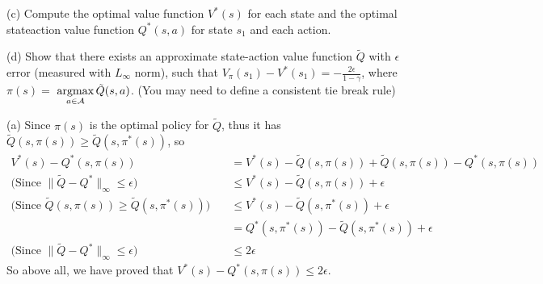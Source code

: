 \begin{homeworkProblem}
(c) Compute the optimal value function $V^*(s)$ for each state and the optimal stateaction value function $Q^*(s, a)$ for state $s_1$ and each action.

(d) Show that there exists an approximate state-action value function $\tilde{Q}$ with $\epsilon$ error (measured with $L_{\infty}$ norm), such that $V_\pi\left(s_1\right)-V^*\left(s_1\right)=-\frac{2 \epsilon}{1-\gamma}$, where $\pi(s)=$ $\mathop{\rm argmax}\limits_{a \in \mathcal{A}} \tilde{Q}(s, a)$. (You may need to define a consistent tie break rule)

\solution

(a) Since $\pi(s)$ is the optimal policy for $\tilde{Q}$, thus it has $\tilde{Q}(s, \pi(s)) \geq \tilde{Q}(s, \pi^*(s))$, so
\begin{align*}
V^*(s)-Q^*(s,\pi(s)) &= V^*(s)-\tilde{Q}(s,\pi(s))+\tilde{Q}(s,\pi(s))-Q^*(s,\pi(s)) \\
\text{(Since $\|\tilde{Q}-Q^*\|_{\infty} \leq \epsilon$)}\quad & \leq V^*(s) - \tilde{Q}(s, \pi(s)) + \epsilon \\
\text{(Since $\tilde{Q}(s, \pi(s)) \geq \tilde{Q}(s, \pi^*(s))$)}\quad & \leq V^*(s) - \tilde{Q}(s, \pi^*(s)) + \epsilon \\
&= Q^*(s, \pi^*(s)) - \tilde{Q}(s, \pi^*(s)) + \epsilon \\
\text{(Since $\|\tilde{Q}-Q^*\|_{\infty}\leq \epsilon$)}\quad & \leq 2\epsilon
\end{align*}
So above all, we have proved that $V^*(s) - Q^*(s, \pi(s)) \leq 2\epsilon$.


\end{homeworkProblem}
